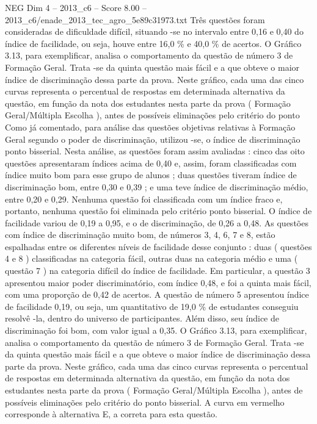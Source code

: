 \begin{textsample}{NEG Dim 4 – 2013\_c6 – Score 8.00 – 2013\_c6/enade\_2013\_tec\_agro\_5e89c31973.txt}
Três questões foram consideradas de dificuldade difícil, situando -se no intervalo entre 0,16 e 0,40 do índice de facilidade, ou seja, houve entre 16,0 \% e 40,0 \% de acertos.
O Gráfico 3.13, para exemplificar, analisa o comportamento da questão de número 3 de Formação Geral.
Trata -se da quinta questão mais fácil e a que obteve o maior índice de discriminação dessa parte da prova.
Neste gráfico, cada uma das cinco curvas representa o percentual de respostas em determinada alternativa da questão, em função da nota dos estudantes nesta parte da prova ( Formação Geral/Múltipla Escolha ), antes de possíveis eliminações pelo critério do ponto Como já comentado, para análise das questões objetivas relativas à Formação Geral segundo o poder de discriminação, utilizou -se, o índice de discriminação ponto bisserial.
Nesta análise, as questões foram assim avaliadas : cinco das oito questões apresentaram índices acima de 0,40 e, assim, foram classificadas com índice muito bom para esse grupo de alunos ; duas questões tiveram índice de discriminação bom, entre 0,30 e 0,39 ; e uma teve índice de discriminação médio, entre 0,20 e 0,29.
Nenhuma questão foi classificada com um índice fraco e, portanto, nenhuma questão foi eliminada pelo critério ponto bisserial.
O índice de facilidade variou de 0,19 a 0,95, e o de discriminação, de 0,26 a 0,48.
As questões com índice de discriminação muito bom, de números 3, 4, 6, 7 e 8, estão espalhadas entre os diferentes níveis de facilidade desse conjunto : duas ( questões 4 e 8 ) classificadas na categoria fácil, outras duas na categoria médio e uma ( questão 7 ) na categoria difícil do índice de facilidade.
Em particular, a questão 3 apresentou maior poder discriminatório, com índice 0,48, e foi a quinta mais fácil, com uma proporção de 0,42 de acertos.
A questão de número 5 apresentou índice de facilidade 0,19, ou seja, um quantitativo de 19,0 \% de estudantes conseguiu resolvê -la, dentro do universo de participantes.
Além disso, seu índice de discriminação foi bom, com valor igual a 0,35.
O Gráfico 3.13, para exemplificar, analisa o comportamento da questão de número 3 de Formação Geral.
Trata -se da quinta questão mais fácil e a que obteve o maior índice de discriminação dessa parte da prova.
Neste gráfico, cada uma das cinco curvas representa o percentual de respostas em determinada alternativa da questão, em função da nota dos estudantes nesta parte da prova ( Formação Geral/Múltipla Escolha ), antes de possíveis eliminações pelo critério do ponto bisserial.
A curva em vermelho corresponde à alternativa E, a correta para esta questão.

\end{textsample}
